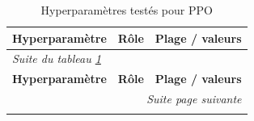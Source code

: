 \begingroup
\footnotesize
\setlength{\tabcolsep}{8pt}
\renewcommand{\arraystretch}{1.4}
\begin{longtable}{%
  p{\hpColA}%
  p{\dimexpr\textwidth - \hpColA - \hpColC - 6\tabcolsep\relax}%
  p{\hpColC}%
}
  \caption{Hyperparamètres testés pour PPO}
  \label{tab:hparams_ppo}\\
  \toprule
  \textbf{Hyperparamètre} & \textbf{Rôle} & \textbf{Plage / valeurs}\\
  \midrule
\endfirsthead
  \multicolumn{3}{l}{\footnotesize\itshape Suite du tableau \ref{tab:hparams_ppo}}\\[2pt]
  \toprule
  \textbf{Hyperparamètre} & \textbf{Rôle} & \textbf{Plage / valeurs}\\
  \midrule
\endhead
  \midrule
  \multicolumn{3}{r}{\footnotesize\itshape Suite page suivante}\\
\endfoot
  \bottomrule
\endlastfoot


\end{longtable}
